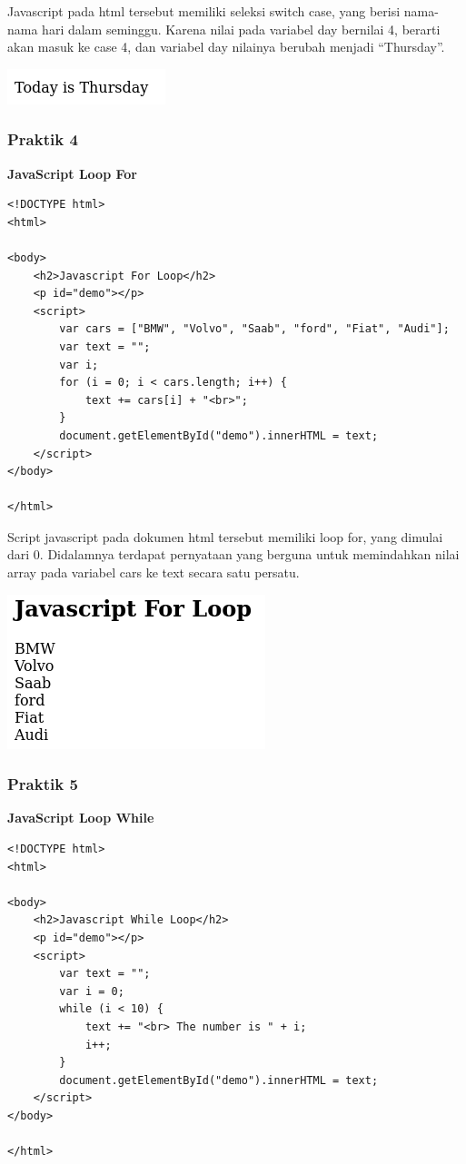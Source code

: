 \documentclass[a4paper,12pt]{article}
\begin{document}
Javascript pada html tersebut memiliki seleksi switch case, yang berisi nama-nama hari dalam seminggu. Karena nilai pada
variabel day bernilai 4, berarti akan masuk ke case 4, dan variabel day nilainya berubah menjadi ``Thursday''.
\begin{center}
    \includegraphics[scale=.7]{3.png} 
\end{center}

\subsubsection{Praktik 4}
\textbf{JavaScript Loop For\\}
\begin{lstlisting}
<!DOCTYPE html>
<html>

<body>
    <h2>Javascript For Loop</h2>
    <p id="demo"></p>
    <script>
        var cars = ["BMW", "Volvo", "Saab", "ford", "Fiat", "Audi"];
        var text = "";
        var i;
        for (i = 0; i < cars.length; i++) {
            text += cars[i] + "<br>";
        }
        document.getElementById("demo").innerHTML = text;
    </script>
</body>

</html>
\end{lstlisting}
Script javascript pada dokumen html tersebut memiliki loop for, yang dimulai dari 0. Didalamnya terdapat pernyataan yang
berguna untuk memindahkan nilai array pada variabel cars ke text secara satu persatu.

\begin{center}
    \includegraphics[scale=.7]{4.png} 
\end{center}

\subsubsection{Praktik 5}
\textbf{JavaScript Loop While\\}
\begin{lstlisting}
<!DOCTYPE html>
<html>

<body>
    <h2>Javascript While Loop</h2>
    <p id="demo"></p>
    <script>
        var text = "";
        var i = 0;
        while (i < 10) {
            text += "<br> The number is " + i;
            i++;
        }
        document.getElementById("demo").innerHTML = text;
    </script>
</body>

</html>
\end{lstlisting}
\end{document}
